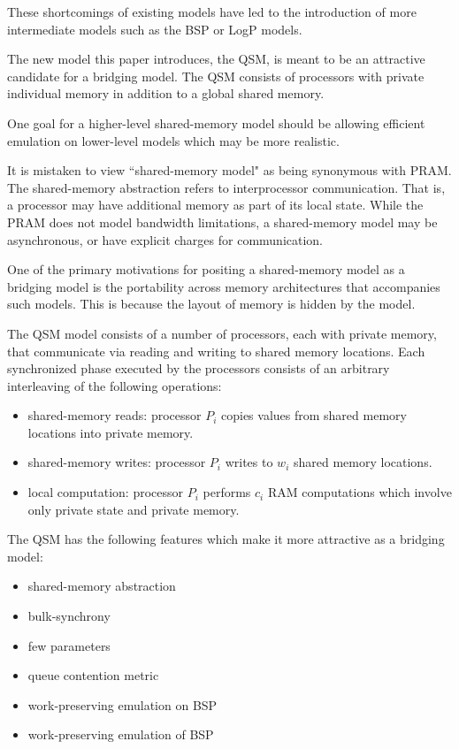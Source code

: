 \documentclass[12pt,a4paper]{article}
\begin{document}
These shortcomings of existing models have led to the introduction of more intermediate models such as the BSP or LogP models.

The new model this paper introduces, the QSM, is meant to be an attractive candidate for a bridging model. The QSM consists of processors with private
individual memory in addition to a global shared memory.

One goal for a 
higher-level shared-memory model should be allowing efficient emulation on lower-level models which may be more realistic. 

It is mistaken to view ``shared-memory model" as being synonymous with PRAM. The shared-memory abstraction refers to interprocessor communication. That is, a
processor may have additional memory as part of its local state. While the PRAM does not model bandwidth limitations, a shared-memory model may be
asynchronous, or have explicit charges for communication. 

One of the primary motivations for positing a shared-memory model as a bridging model is the portability across memory architectures that accompanies such
models. This is because the layout of memory is hidden by the model.

The QSM model consists of a number of processors, each with private memory, that communicate via reading and writing to shared memory locations. Each
synchronized phase executed by the processors consists of an arbitrary interleaving of the following operations:

\begin{itemize}
\item shared-memory reads: processor $P_i$ copies values from shared memory locations into private memory. 
\item shared-memory writes: processor $P_i$ writes to $w_i$ shared memory locations.
\item local computation: processor $P_i$ performs $c_i$ RAM computations which involve only private state and private memory.
\end{itemize}

The QSM has the following features which make it more attractive as a bridging model:

\begin{itemize}
\item shared-memory abstraction
\item bulk-synchrony
\item few parameters
\item queue contention metric
\item work-preserving emulation on BSP
\item work-preserving emulation of BSP
\end{itemize}
\end{document}
